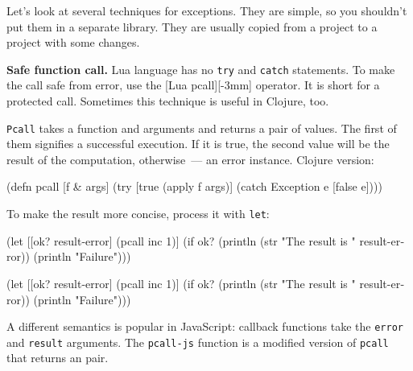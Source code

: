 Let's look at several techniques for exceptions. They are simple, so you shouldn't put them in a separate library. They are usually copied from a project to a project with some changes.


\label{pcall}

\textbf{ Safe function call.} Lua language has no \verb|try| and \verb|catch| statements. To make the call safe from error, use the [Lua pcall][-3mm] operator. It is short for a protected call. Sometimes this technique is useful in Clojure, too.

\verb|Pcall| takes a function and arguments and returns a pair of values. The first of them signifies a successful execution. If it is true, the second value will be the result of the computation, otherwise~--- an error instance. Clojure version:


\begin{english}
  \begin{clojure}
(defn pcall [f & args]
  (try
    [true (apply f args)]
    (catch Exception e [false e])))
  \end{clojure}
\end{english}

To make the result more concise, process it with \verb|let|:

\ifx\DEVICETYPE\MOBILE

\begin{english}
  \begin{clojure}
(let [[ok? result-error] (pcall inc 1)]
  (if ok?
    (println
      (str "The result is "
        result-error))
    (println "Failure")))
  \end{clojure}
\end{english}

\else

\begin{english}
  \begin{clojure}
(let [[ok? result-error] (pcall inc 1)]
  (if ok?
    (println (str "The result is " result-error))
    (println "Failure")))
  \end{clojure}
\end{english}

\fi


A different semantics is popular in JavaScript: callback functions take the \verb|error| and \verb|result| arguments. The \verb|pcall-js| function is a modified version of \verb|pcall| that returns an  pair.

